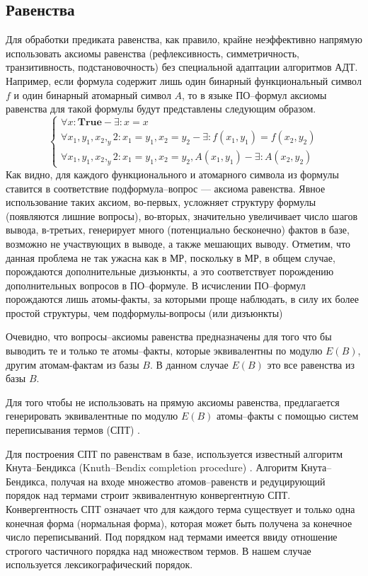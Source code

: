 \subsection{Равенства}
Для обработки предиката равенства, как правило, крайне неэффективно напрямую использовать аксиомы равенства (рефлексивность, симметричность, транзитивность, подстановочность) без специальной адаптации алгоритмов АДТ. Например, если формула содержит лишь один бинарный функциональный символ $f$ и один бинарный атомарный символ $A$, то в языке ПО--формул аксиомы равенства для такой формулы будут представлены следующим образом.
$$\left\lbrace
\begin{array}{l}
\forall x\colon\boldsymbol{True} - \exists\colon x = x \\
\forall x_1,y_1,x_2,_y2\colon x_1 = y_1, x_2 = y_2 - \exists\colon f(x_1,y_1) = f(x_2, y_2) \\
\forall x_1,y_1,x_2,_y2\colon x_1 = y_1, x_2 = y_2, A(x_1,y_1) - \exists\colon A(x_2,y_2)
\end{array}\right.
$$
Как видно, для каждого функционального и атомарного символа из формулы ставится в соответствие подформула--вопрос --- аксиома равенства. Явное использование таких аксиом, во-первых, усложняет структуру формулы (появляются лишние вопросы), во-вторых, значительно увеличивает число шагов вывода, в-третьих, генерирует много (потенциально бесконечно) фактов в базе, возможно не участвующих в выводе, а также мешающих выводу. Отметим, что данная проблема не так ужасна как в МР, поскольку в МР, в общем случае,  порождаются дополнительные дизъюнкты, а это соответствует порождению дополнительных вопросов в ПО--формуле. В исчислении ПО--формул порождаются лишь атомы-факты, за которыми проще наблюдать, в силу их более простой структуры, чем подформулы-вопросы (или дизъюнкты)

Очевидно, что вопросы--аксиомы равенства предназначены для того что бы выводить те и только те атомы--факты, которые эквивалентны по модулю $E(B)$, другим атомам-фактам из базы $B$. В данном случае $E(B)$ это все равенства из базы $B$.

Для того чтобы не использовать на прямую аксиомы равенства, предлагается генерировать эквивалентные по модулю $E(B)$ атомы--факты с помощью систем переписывания термов (СПТ) \cite{Nipkow}.

Для построения СПТ по равенствам в базе, используется известный алгоритм Кнута--Бендикса (Knuth--Bendix completion procedure) \cite{KBAlg}. Алгоритм Кнута--Бендикса, получая на входе множество атомов--равенств и редуцирующий порядок над термами \cite{Nipkow} строит эквивалентную конвергентную СПТ. Конвергентность СПТ означает что для каждого терма существует и только одна конечная форма (нормальная форма), которая может быть получена за конечное число переписываний. Под порядком над термами имеется ввиду отношение строгого частичного порядка над множеством термов. В нашем случае используется лексикографический порядок.

